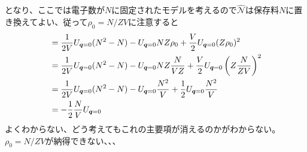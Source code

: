 \documentclass[dvipdfmx, 11pt, a4paper]{jsarticle}
\theoremstyle{definition}
\numberwithin{equation}{section}
\begin{document}
    となり、ここでは電子数が$N$に固定されたモデルを考えるので$\hat{\mathscr{N}}$は保存料$N$に置き換えてよい、従って$\rho_0 = N/ZV$に注意すると
    \begin{align}
        &=\frac{1}{2V} U_{\bm{q}=0} (N^2-N) - U_{\bm{q}=0}N Z\rho_0 + \frac{V}{2}U_{\bm{q}=0}(Z\rho_0)^2 \notag \\
        &=\frac{1}{2V} U_{\bm{q}=0} (N^2-N) - U_{\bm{q}=0}N Z\frac{N}{VZ} + \frac{V}{2}U_{\bm{q}=0}\left(Z\frac{N}{ZV}\right)^2 \\
        &=\frac{1}{2V} U_{\bm{q}=0} (N^2-N) - U_{\bm{q}=0}\frac{N^2}{V} + \frac{1}{2}U_{\bm{q}=0}\frac{N^2}{V} \\
        &= -\frac{1}{2}\frac{N}{V}U_{\bm{q}=0}
    \end{align}
    よくわからない、どう考えてもこれの主要項が消えるのかがわからない。$\rho_0 = N/ZV$が納得できない、、、
\end{document}
